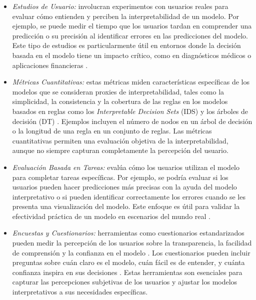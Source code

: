 \begin{itemize}
    \item \textit{Estudios de Usuario:} involucran experimentos con usuarios reales para evaluar cómo entienden y perciben la interpretabilidad de un modelo. Por ejemplo, se puede medir el tiempo que los usuarios tardan en comprender una predicción o su precisión al identificar errores en las predicciones del modelo. Este tipo de estudios es particularmente útil en entornos donde la decisión basada en el modelo tiene un impacto crítico, como en diagnósticos médicos o aplicaciones financieras \cite{Kaur-2020}.
    
    \item \textit{Métricas Cuantitativas:} estas métricas miden características específicas de los modelos que se consideran proxies de interpretabilidad, tales como la simplicidad, la consistencia y la cobertura de las reglas en los modelos basados en reglas como los \textit{Interpretable Decision Sets} (IDS) y los árboles de decisión (DT) \cite{gilpin2018explaining}. Ejemplos incluyen el número de nodos en un árbol de decisión o la longitud de una regla en un conjunto de reglas. Las métricas cuantitativas permiten una evaluación objetiva de la interpretabilidad, aunque no siempre capturan completamente la percepción del usuario.
    
    \item \textit{Evaluación Basada en Tareas:} evalúa cómo los usuarios utilizan el modelo para completar tareas específicas. Por ejemplo, se podría evaluar si los usuarios pueden hacer predicciones más precisas con la ayuda del modelo interpretativo o si pueden identificar correctamente los errores cuando se les presenta una visualización del modelo. Este enfoque es útil para validar la efectividad práctica de un modelo en escenarios del mundo real \cite{doshi2017towards}.
    
    \item \textit{Encuestas y Cuestionarios:} herramientas como cuestionarios estandarizados pueden medir la percepción de los usuarios sobre la transparencia, la facilidad de comprensión y la confianza en el modelo \cite{ribeiro2016should}. Los cuestionarios pueden incluir preguntas sobre cuán claro es el modelo, cuán fácil es de entender, y cuánta confianza inspira en sus decisiones \cite{Kaur-2020}. Estas herramientas son esenciales para capturar las percepciones subjetivas de los usuarios y ajustar los modelos interpretativos a sus necesidades específicas.
\end{itemize}

